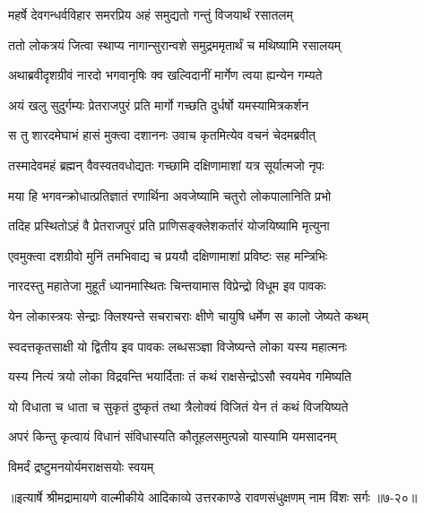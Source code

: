 \twolineshloka
{महर्षे देवगन्धर्वविहार समरप्रिय}
{अहं समुद्यतो गन्तुं विजयार्थं रसातलम्} %

\twolineshloka
{ततो लोकत्रयं जित्वा स्थाप्य नागान्सुरान्वशे}
{समुद्रममृतार्थं च मथिष्यामि रसालयम्} %

\twolineshloka
{अथाब्रवीदृशग्रीवं नारदो भगवानृषिः}
{क्व खल्विदानीं मार्गेण त्वया ह्यन्येन गम्यते} %

\twolineshloka
{अयं खलु सुदुर्गम्यः प्रेतराजपुरं प्रति}
{मार्गो गच्छति दुर्धर्षो यमस्यामित्रकर्शन} %

\twolineshloka
{स तु शारदमेघाभं हासं मुक्त्वा दशाननः}
{उवाच कृतमित्येव वचनं चेदमब्रवीत्} %

\twolineshloka
{तस्मादेवमहं ब्रह्मन् वैवस्वतवधोद्यतः}
{गच्छामि दक्षिणामाशां यत्र सूर्यात्मजो नृपः} %

\twolineshloka
{मया हि भगवन्क्रोधात्प्रतिज्ञातं रणार्थिना}
{अवजेष्यामि चतुरो लोकपालानिति प्रभो} %

\twolineshloka
{तदिह प्रस्थितोऽहं वै प्रेतराजपुरं प्रति}
{प्राणिसङ्क्लेशकर्तारं योजयिष्यामि मृत्युना} %

\twolineshloka
{एवमुक्त्वा दशग्रीवो मुनिं तमभिवाद्य च}
{प्रययौ दक्षिणामाशां प्रविष्टः सह मन्त्रिभिः} %

\twolineshloka
{नारदस्तु महातेजा मुहूर्तं ध्यानमास्थितः}
{चिन्तयामास विप्रेन्द्रो विधूम इव पावकः} %

\twolineshloka
{येन लोकास्त्रयः सेन्द्राः क्लिश्यन्ते सचराचराः}
{क्षीणे चायुषि धर्मेण स कालो जेष्यते कथम्} %

\twolineshloka
{स्वदत्तकृतसाक्षी यो द्वितीय इव पावकः}
{लब्धसञ्ज्ञा विजेष्यन्ते लोका यस्य महात्मनः} %

\twolineshloka
{यस्य नित्यं त्रयो लोका विद्रवन्ति भयार्दिताः}
{तं कथं राक्षसेन्द्रोऽसौ स्वयमेव गमिष्यति} %

\twolineshloka
{यो विधाता च धाता च सुकृतं दुष्कृतं तथा}
{त्रैलोक्यं विजितं येन तं कथं विजयिष्यते} %

\twolineshloka
{अपरं किन्तु कृत्वायं विधानं संविधास्यति}
{कौतूहलसमुत्पन्नो यास्यामि यमसादनम्} %

\onelineshloka
{विमर्दं द्रष्टुमनयोर्यमराक्षसयोः स्वयम्} %


॥इत्यार्षे श्रीमद्रामायणे वाल्मीकीये आदिकाव्ये उत्तरकाण्डे रावणसंधुक्षणम् नाम विंशः सर्गः ॥७-२०॥
